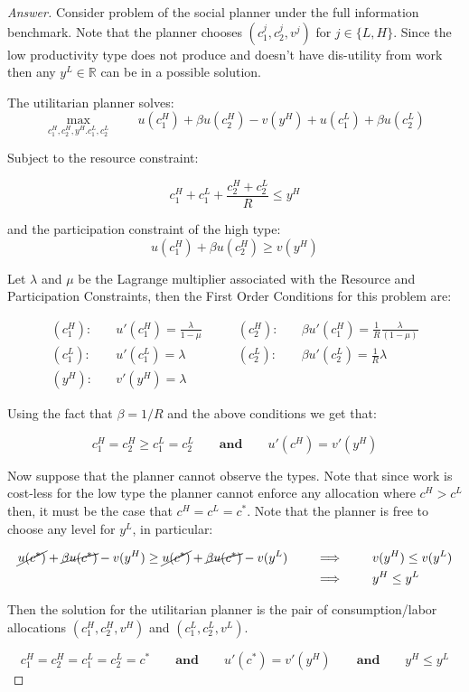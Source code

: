 \documentclass[12pt]{article}
\theoremstyle{definition}
\newcommand{\qiq}{\qquad \implies \qquad}
\newcommand{\qaq}{\qquad \textbf{and} \qquad}
\begin{document}
\begin{proof}[Answer]
Consider problem of the social planner under the full information benchmark. Note that the planner chooses $(c_1^j,c_2^j, v^j)$ for $j\in\{L,H\}$. Since the low productivity type does not produce and doesn't have dis-utility from work then any $y^L \in \mathbb{R}$ can be in a possible solution. 

The utilitarian planner solves:
$$\max_{c_1^H, c_2^H, y^H. c_1^L, c_2^L} \qquad u(c_1^H) + \beta u(c_2^H) - v(y^H) + u(c_1^L) + \beta u(c_2^L)$$

Subject to the resource constraint:

$$c_1^H + c_1^L + \frac{c_2^H+ c_2^L}{R} \leq y^H$$

and the participation constraint of the high type:
$$u(c_1^H) + \beta u(c_2^H) \geq v(y^H)$$

Let $\lambda$ and $\mu$ be the Lagrange multiplier associated with the Resource and Participation Constraints, then the First Order Conditions for this problem are:

\begin{align*}
    (c_1^H):&\quad u'(c_1^H) = \frac{\lambda}{1-\mu} &\qquad (c_2^H):&\quad \beta u'(c_1^H) = \frac{1}{R}\frac{\lambda}{(1-\mu)} \\   (c_1^L):&\quad u'(c_1^L) = \lambda &\qquad (c_2^L):&\quad \beta u'(c_2^L) = \frac{1}{R}\lambda
    \\ (y^H):&\quad v'(y^H) = \lambda 
\end{align*}

Using the fact that $\beta = 1/R$ and the above conditions we get that:

$$c_1^H = c_2^H\geq c_1^L = c_2^L \qaq u'(c^H) = v'(y^H)$$

Now suppose that the planner cannot observe the types. Note that since work is cost-less for the low type the planner cannot enforce any allocation where $c^H > c^L$ then, it must be the case that $c^H=c^L =c^*$. Note that the planner is free to choose any level for $y^L$, in particular:

\begin{align*}
\cancel{u(c^*)} + \cancel{\beta u(c^*)} - v(y^H) \geq \cancel{u(c^*)} + \cancel{\beta u(c^*)} - v(y^L) &\qiq v(y^H) \leq  v(y^L) \\ &\qiq y^H \leq  y^L \end{align*} 

Then the solution for the utilitarian  planner is the pair of consumption/labor allocations $(c_1^H,c_2^H, v^H)$ and $(c_1^L,c_2^L, v^L)$.

$$c_1^H = c_2^H = c_1^L = c_2^L = c^* \qaq u'(c^*) = v'(y^H) \qaq y^H \leq  y^L$$

 
\end{proof}
\end{document}
